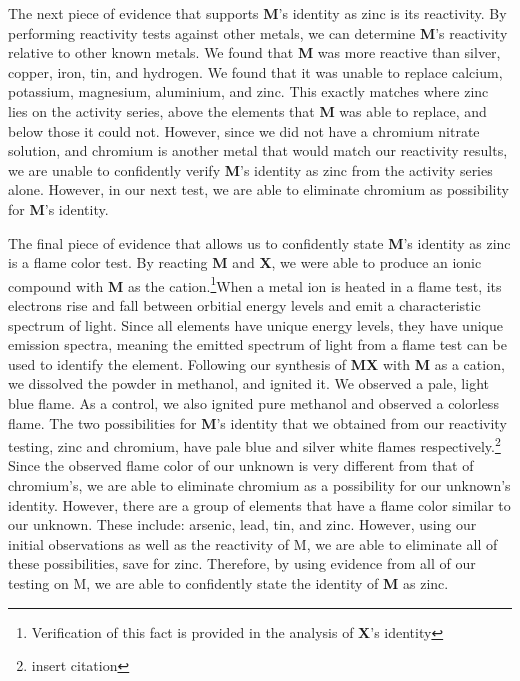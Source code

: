 \documentclass[titlepage]{article}
\begin{document}
The next piece of evidence that supports \textbf{M}'s identity as zinc is its reactivity. By performing reactivity tests against other metals, we can determine \textbf{M}'s reactivity relative to other known metals. We found that \textbf{M} was more reactive than silver, copper, iron, tin, and hydrogen. We found that it was unable to replace calcium, potassium, magnesium, aluminium, and zinc. This exactly matches where zinc lies on the activity series, above the elements that \textbf{M} was able to replace, and below those it could not. However, since we did not have a chromium nitrate solution, and chromium is another metal that would match our reactivity results, we are unable to confidently verify \textbf{M}'s identity as zinc from the activity series alone. However, in our next test, we are able to eliminate chromium as possibility for \textbf{M}'s identity.

The final piece of evidence that allows us to confidently state \textbf{M}'s identity as zinc is a flame color test. By reacting \textbf{M} and \textbf{X}, we were able to produce an ionic compound with \textbf{M} as the cation.\footnote{Verification of this fact is provided in the analysis of \textbf{X}'s identity}When a metal ion is heated in a flame test, its electrons rise and fall between orbitial energy levels and emit a characteristic spectrum of light. Since all elements have unique energy levels, they have unique emission spectra, meaning the emitted spectrum of light from a flame test can be used to identify the element. Following our synthesis of \textbf{MX} with \textbf{M} as a cation, we dissolved the powder in methanol, and ignited it. We observed a pale, light blue flame. As a control, we also ignited pure methanol and observed a colorless flame. The two possibilities for \textbf{M}'s identity that we obtained from our reactivity testing, zinc and chromium, have pale blue and silver white flames respectively.\footnote{insert citation} Since the observed flame color of our unknown is very different from that of chromium's, we are able to eliminate chromium as a possibility for our unknown's identity. However, there are a group of elements that have a flame color similar to our unknown. These include: arsenic, lead, tin, and zinc. However, using our initial observations as well as the reactivity of M, we are able to eliminate all of these possibilities, save for zinc. Therefore, by using evidence from all of our testing on M, we are able to confidently state the identity of \textbf{M} as zinc.
\end{document}
